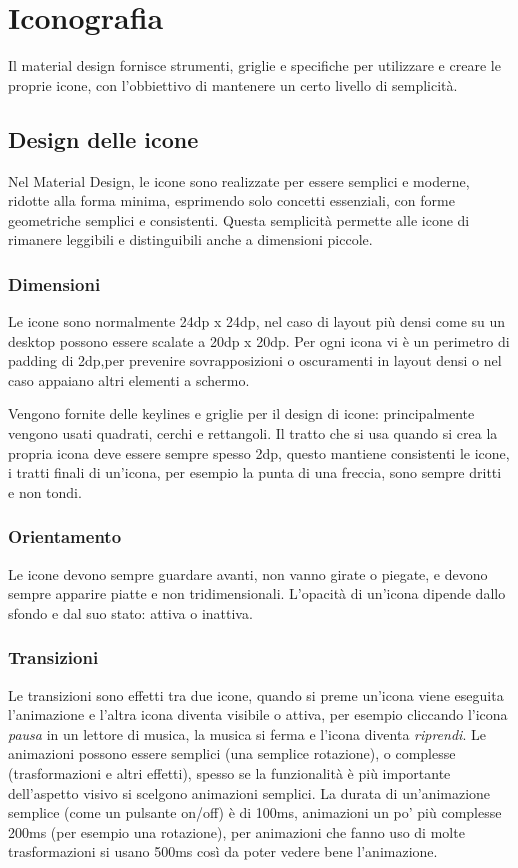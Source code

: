 \documentclass[12pt, a4paper]{report}
\begin{document}
	\section{Iconografia}
		Il material design fornisce strumenti, griglie e specifiche per utilizzare e creare le proprie icone, con l'obbiettivo di mantenere un certo livello di semplicità.
		\subsection{Design delle icone}
			Nel Material Design, le icone sono realizzate per essere semplici e moderne, ridotte alla forma minima, esprimendo solo concetti essenziali, con forme geometriche semplici e consistenti. Questa semplicità permette alle icone di rimanere leggibili e distinguibili anche a dimensioni piccole.

			\subsubsection{Dimensioni}
			Le icone sono normalmente 24dp x 24dp, nel caso di layout più densi come su un desktop possono essere scalate a 20dp x 20dp.
			Per ogni icona vi è un perimetro di padding di 2dp,per prevenire sovrapposizioni o oscuramenti in layout densi o nel caso appaiano altri elementi a schermo.

			Vengono fornite delle keylines e griglie per il design di icone: principalmente vengono usati quadrati, cerchi e rettangoli.
			Il tratto che si usa quando si crea la propria icona deve essere sempre spesso 2dp, questo mantiene consistenti le icone, i tratti finali di un'icona, per esempio la punta di una freccia, sono sempre dritti e non tondi.

			\subsubsection{Orientamento}
			Le icone devono sempre guardare avanti, non vanno girate o piegate, e devono sempre apparire piatte e non tridimensionali.
			L'opacità di un'icona dipende dallo sfondo e dal suo stato: attiva o inattiva.

			\subsubsection{Transizioni}
				Le transizioni sono effetti tra due icone, quando si preme un'icona viene eseguita l'animazione e l'altra icona diventa visibile o attiva, per esempio cliccando l'icona \textit{pausa} in un lettore di musica, la musica si ferma e l'icona diventa \textit{riprendi}.
				Le animazioni possono essere semplici (una semplice rotazione), o complesse (trasformazioni e altri effetti), spesso se la funzionalità è più importante dell'aspetto visivo si scelgono animazioni semplici.
				La durata di un'animazione semplice (come un pulsante on/off) è di 100ms, animazioni un po' più complesse 200ms (per esempio una rotazione), per animazioni che fanno uso di molte trasformazioni si usano 500ms così da poter vedere bene l'animazione.
\end{document}
